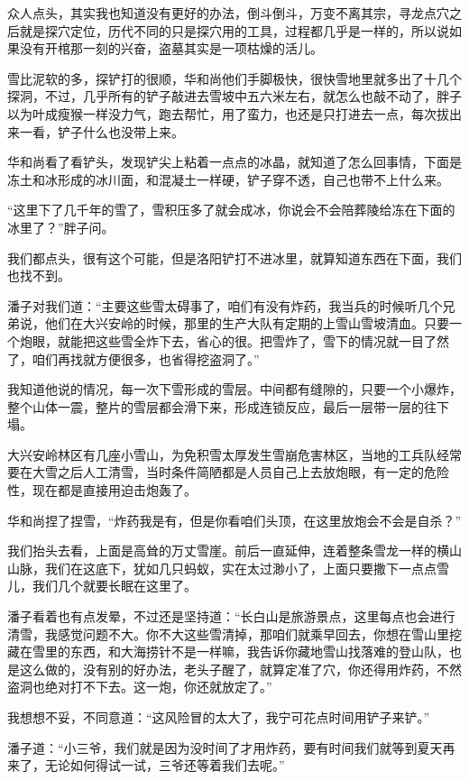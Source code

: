 众人点头，其实我也知道没有更好的办法，倒斗倒斗，万变不离其宗，寻龙点穴之后就是探穴定位，历代不同的只是探穴用的工具，过程都几乎是一样的，所以说如果没有开棺那一刻的兴奋，盗墓其实是一项枯燥的活儿。

雪比泥软的多，探铲打的很顺，华和尚他们手脚极快，很快雪地里就多出了十几个探洞，不过，几乎所有的铲子敲进去雪坡中五六米左右，就怎么也敲不动了，胖子以为叶成瘦猴一样没力气，跑去帮忙，用了蛮力，也还是只打进去一点，每次拔出来一看，铲子什么也没带上来。

华和尚看了看铲头，发现铲尖上粘着一点点的冰晶，就知道了怎么回事情，下面是冻土和冰形成的冰川面，和混凝土一样硬，铲子穿不透，自己也带不上什么来。

“这里下了几千年的雪了，雪积压多了就会成冰，你说会不会陪葬陵给冻在下面的冰里了？”胖子问。

我们都点头，很有这个可能，但是洛阳铲打不进冰里，就算知道东西在下面，我们也找不到。

潘子对我们道：“主要这些雪太碍事了，咱们有没有炸药，我当兵的时候听几个兄弟说，他们在大兴安岭的时候，那里的生产大队有定期的上雪山雪坡清血。只要一个炮眼，就能把这些雪全炸下去，省心的很。把雪炸了，雪下的情况就一目了然了，咱们再找就方便很多，也省得挖盗洞了。”

我知道他说的情况，每一次下雪形成的雪层。中间都有缝隙的，只要一个小爆炸，整个山体一震，整片的雪层都会滑下来，形成连锁反应，最后一层带一层的往下塌。

大兴安岭林区有几座小雪山，为免积雪太厚发生雪崩危害林区，当地的工兵队经常要在大雪之后人工清雪，当时条件简陋都是人员自己上去放炮眼，有一定的危险性，现在都是直接用迫击炮轰了。

华和尚捏了捏雪，“炸药我是有，但是你看咱们头顶，在这里放炮会不会是自杀？”

我们抬头去看，上面是高耸的万丈雪崖。前后一直延伸，连着整条雪龙一样的横山山脉，我们在这底下，犹如几只蚂蚁，实在太过渺小了，上面只要撒下一点点雪儿，我们几个就要长眠在这里了。

潘子看着也有点发晕，不过还是坚持道：“长白山是旅游景点，这里每点也会进行清雪，我感觉问题不大。你不大这些雪清掉，那咱们就乘早回去，你想在雪山里挖藏在雪里的东西，和大海捞针不是一样嘛，我告诉你藏地雪山找落难的登山队，也是这么做的，没有别的好办法，老头子醒了，就算定准了穴，你还得用炸药，不然盗洞也绝对打不下去。这一炮，你还就放定了。”

我想想不妥，不同意道：“这风险冒的太大了，我宁可花点时间用铲子来铲。”

潘子道：“小三爷，我们就是因为没时间了才用炸药，要有时间我们就等到夏天再来了，无论如何得试一试，三爷还等着我们去呢。”

